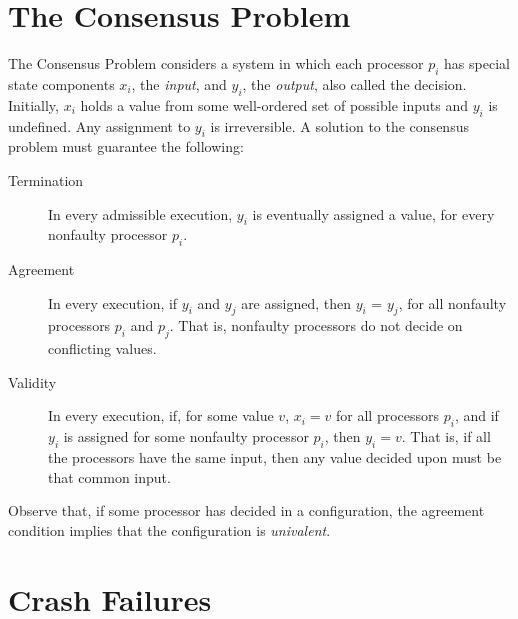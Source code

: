 \documentclass{article}
\begin{document}
\section{The Consensus Problem}
The Consensus Problem considers a system in which each processor $p_i$ has special state components $x_i$, the \textit{input}, and $y_i$, the \textit{output}, also called the decision. Initially, $x_i$ holds a value from some well-ordered set of possible inputs and $y_i$ is undefined. Any assignment to $y_i$ is irreversible. A solution to the consensus problem must guarantee the following: 
\begin{description}

\item[Termination] In every admissible execution, $y_i$ is eventually assigned a value, for every nonfaulty processor $p_i$.
 \item[Agreement] In every execution, if $y_i$ and $y_j$ are assigned, then $y_i$ = $y_j$, for all nonfaulty processors $p_i$ and $p_j$. That is, nonfaulty processors do not decide on conflicting values.
\item[Validity] In every execution, if, for some value $v$, $x_i = v$ for all processors $p_i$, and if $y_i$ is assigned for some nonfaulty processor $p_i$, then $y_i = v$. That is, if all the processors have the same input, then any value decided upon must be that common input. 
\end{description}

Observe that, if some processor has decided in a configuration, the agreement condition implies that the configuration is \textit{univalent}.
\section{Crash Failures}
\end{document}
